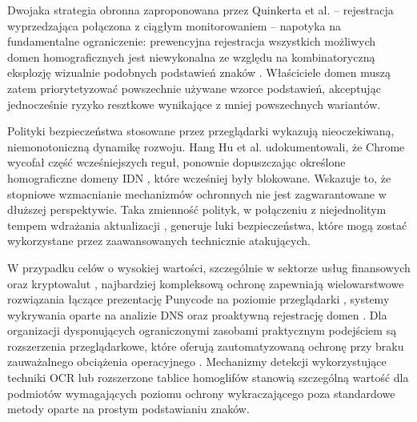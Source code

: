 Dwojaka strategia obronna zaproponowana przez Quinkerta et al. – rejestracja wyprzedzająca połączona z ciągłym monitorowaniem \cite{Quinkert} – napotyka na fundamentalne ograniczenie: prewencyjna rejestracja wszystkich możliwych domen homograficznych jest niewykonalna ze względu na kombinatoryczną eksplozję wizualnie podobnych podstawień znaków \cite{Quinkert}. Właściciele domen muszą zatem priorytetyzować powszechnie używane wzorce podstawień, akceptując jednocześnie ryzyko resztkowe wynikające z mniej powszechnych wariantów.

Polityki bezpieczeństwa stosowane przez przeglądarki wykazują nieoczekiwaną, niemonotoniczną dynamikę rozwoju. Hang Hu et al. udokumentowali, że Chrome wycofał część wcześniejszych reguł, ponownie dopuszczając określone homograficzne domeny IDN \cite{Hu2021}, które wcześniej były blokowane. Wskazuje to, że stopniowe wzmacnianie mechanizmów ochronnych nie jest zagwarantowane w dłuższej perspektywie. Taka zmienność polityk, w połączeniu z niejednolitym tempem wdrażania aktualizacji \cite{McElroy2017}, generuje luki bezpieczeństwa, które mogą zostać wykorzystane przez zaawansowanych technicznie atakujących.

W przypadku celów o wysokiej wartości, szczególnie w sektorze usług finansowych oraz kryptowalut \cite{Suzuki2019}, najbardziej kompleksową ochronę zapewniają wielowarstwowe rozwiązania łączące prezentację Punycode na poziomie przeglądarki \cite{McElroy2017}, systemy wykrywania oparte na analizie DNS \cite{Yazdani2020} oraz proaktywną rejestrację domen \cite{Quinkert}. Dla organizacji dysponujących ograniczonymi zasobami praktycznym podejściem są rozszerzenia przeglądarkowe, które oferują zautomatyzowaną ochronę przy braku zauważalnego obciążenia operacyjnego \cite{Abawajy2017}. Mechanizmy detekcji wykorzystujące techniki OCR \cite{Sawabe2019} lub rozszerzone tablice homoglifów \cite{Yazdani2020} stanowią szczególną wartość dla podmiotów wymagających poziomu ochrony wykraczającego poza standardowe metody oparte na prostym podstawianiu znaków.

